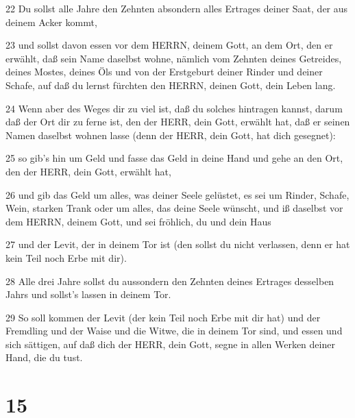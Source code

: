\par 22 Du sollst alle Jahre den Zehnten absondern alles Ertrages deiner Saat, der aus deinem Acker kommt,
\par 23 und sollst davon essen vor dem HERRN, deinem Gott, an dem Ort, den er erwählt, daß sein Name daselbst wohne, nämlich vom Zehnten deines Getreides, deines Mostes, deines Öls und von der Erstgeburt deiner Rinder und deiner Schafe, auf daß du lernst fürchten den HERRN, deinen Gott, dein Leben lang.
\par 24 Wenn aber des Weges dir zu viel ist, daß du solches hintragen kannst, darum daß der Ort dir zu ferne ist, den der HERR, dein Gott, erwählt hat, daß er seinen Namen daselbst wohnen lasse (denn der HERR, dein Gott, hat dich gesegnet):
\par 25 so gib's hin um Geld und fasse das Geld in deine Hand und gehe an den Ort, den der HERR, dein Gott, erwählt hat,
\par 26 und gib das Geld um alles, was deiner Seele gelüstet, es sei um Rinder, Schafe, Wein, starken Trank oder um alles, das deine Seele wünscht, und iß daselbst vor dem HERRN, deinem Gott, und sei fröhlich, du und dein Haus
\par 27 und der Levit, der in deinem Tor ist (den sollst du nicht verlassen, denn er hat kein Teil noch Erbe mit dir).
\par 28 Alle drei Jahre sollst du aussondern den Zehnten deines Ertrages desselben Jahrs und sollst's lassen in deinem Tor.
\par 29 So soll kommen der Levit (der kein Teil noch Erbe mit dir hat) und der Fremdling und der Waise und die Witwe, die in deinem Tor sind, und essen und sich sättigen, auf daß dich der HERR, dein Gott, segne in allen Werken deiner Hand, die du tust.

\chapter{15}

